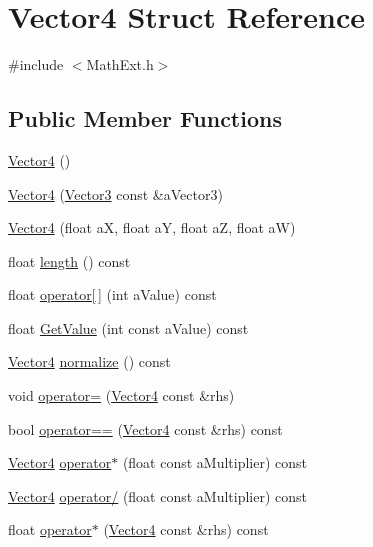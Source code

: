 \hypertarget{structVector4}{}\section{Vector4 Struct Reference}
\label{structVector4}


{\ttfamily \#include $<$Math\+Ext.\+h$>$}

\subsection*{Public Member Functions}
\begin{DoxyCompactItemize}
\item 
\hyperlink{structVector4_a511b4d9c8326c235b76d794eea018921}{Vector4} ()
\item 
\hyperlink{structVector4_ac54a7b01fe8db72539cd5317ec1045ef}{Vector4} (\hyperlink{structVector3}{Vector3} const \&a\+Vector3)
\item 
\hyperlink{structVector4_ac340095dbcfcc2c9ca0ff322d666964f}{Vector4} (float aX, float aY, float aZ, float aW)
\item 
float \hyperlink{structVector4_a0720779f40fd5dc50b47776f31b593e2}{length} () const 
\item 
float \hyperlink{structVector4_aedf58807912e10d1daa25ee35747104f}{operator\mbox{[}$\,$\mbox{]}} (int a\+Value) const 
\item 
float \hyperlink{structVector4_a74d866a2833755a9c20bf51a9eb92642}{Get\+Value} (int const a\+Value) const 
\item 
\hyperlink{structVector4}{Vector4} \hyperlink{structVector4_ab580559799f01a6574be5a6c9903c035}{normalize} () const 
\item 
void \hyperlink{structVector4_ac9e6fb052de08c43307dbf5e45c11c81}{operator=} (\hyperlink{structVector4}{Vector4} const \&rhs)
\item 
bool \hyperlink{structVector4_af23d7bfc04bf558db3136a50581051e3}{operator==} (\hyperlink{structVector4}{Vector4} const \&rhs) const 
\item 
\hyperlink{structVector4}{Vector4} \hyperlink{structVector4_aa92f3efd1c7b539606181b2d59c9ab91}{operator$\ast$} (float const a\+Multiplier) const 
\item 
\hyperlink{structVector4}{Vector4} \hyperlink{structVector4_aa67de74f9cd5448152a04f6348fb5182}{operator/} (float const a\+Multiplier) const 
\item 
float \hyperlink{structVector4_a3cc1037f69d419d9d45b12351f3658f2}{operator$\ast$} (\hyperlink{structVector4}{Vector4} const \&rhs) const 

\end{DoxyCompactItemize}
